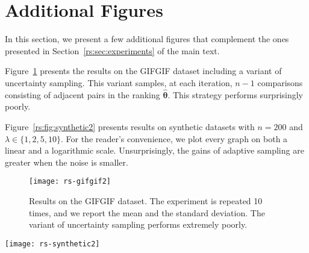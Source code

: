 \section{Additional Figures}  %
\label{rs:app:figures}

In this section, we present a few additional figures that complement the ones presented in Section~\ref{rs:sec:experiments} of the main text.

Figure~\ref{rs:fig:gifgif2} presents the results on the GIFGIF dataset including a variant of uncertainty sampling.
This variant samples, at each iteration, $n-1$ comparisons consisting of adjacent pairs in the ranking $\hat{\bm{\theta}}$.
This strategy performs surprisingly poorly.

Figure~\ref{rs:fig:synthetic2} presents results on synthetic datasets with $n = 200$ and $\lambda \in \{ 1, 2, 5, 10 \}$.
For the reader's convenience, we plot every graph on both a linear and a logarithmic scale.
Unsurprisingly, the gains of adaptive sampling are greater when the noise is smaller.

\begin{figure}[t]
\centering
\texttt{[image: rs-gifgif2]}
\caption{
Results on the GIFGIF dataset.
The experiment is repeated \num{10} times, and we report the mean and the standard deviation.
The variant of uncertainty sampling performs extremely poorly.
}
\label{rs:fig:gifgif2}
\end{figure}


\begin{figure*}[t]
\centering
\texttt{[image: rs-synthetic2]}
\caption{
Results on synthetic datasets for $n = 200$ and increasing values of $\lambda$.
Every experiment is repeated \num{10} times, and we report the mean and the standard deviation.
}
\label{rs:fig:synthetic2}
\end{figure*}
